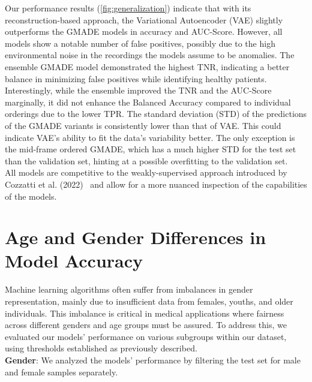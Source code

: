 Our performance results (\autoref{fig:generalization}) indicate that with its reconstruction-based approach, the Variational Autoencoder (VAE) slightly outperforms the GMADE models in accuracy and AUC-Score. However, all models show a notable number of false positives, possibly due to the high environmental noise in the recordings the models assume to be anomalies. The ensemble GMADE model demonstrated the highest TNR, indicating a better balance in minimizing false positives while identifying healthy patients. Interestingly, while the ensemble improved the TNR and the AUC-Score marginally, it did not enhance the Balanced Accuracy compared to individual orderings due to the lower TPR. The standard deviation (STD) of the predictions of the GMADE variants is consistently lower than that of VAE. This could indicate VAE's ability to fit the data's variability better. The only exception is the mid-frame ordered GMADE, which has a much higher STD for the test set than the validation set, hinting at a possible overfitting to the validation set.\\
All models are competitive to the weakly-supervised approach introduced by Cozzatti et al. (2022)~\cite{cozzatti2022variational} and allow for a more nuanced inspection of the capabilities of the models.
\section{Age and Gender Differences in Model Accuracy}
Machine learning algorithms often suffer from imbalances in gender representation, mainly due to insufficient data from females, youths, and older individuals. This imbalance is critical in medical applications where fairness across different genders and age groups must be assured. To address this, we evaluated our models' performance on various subgroups within our dataset, using thresholds established as previously described.\\
\textbf{Gender}: We analyzed the models' performance by filtering the test set for male and female samples separately.

